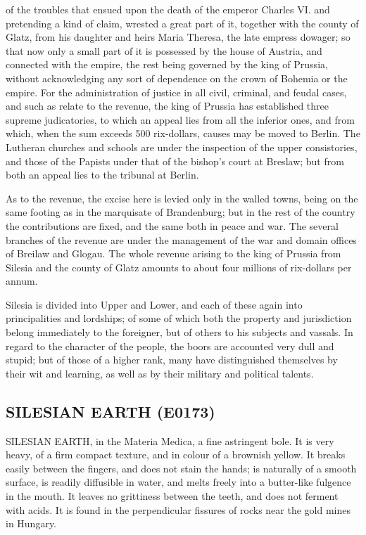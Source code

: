 \documentclass{article}
\begin{document}
of the troubles that ensued upon the death of the emperor Charles VI. and pretending a kind of claim, wrested a great part of it, together with the county of Glatz, from his daughter and heirs Maria Theresa, the late empress dowager; so that now only a small part of it is possessed by the house of Austria, and connected with the empire, the rest being governed by the king of Prussia, without acknowledging any sort of dependence on the crown of Bohemia or the empire. For the administration of justice in all civil, criminal, and feudal cases, and such as relate to the revenue, the king of Prussia has established three supreme judicatories, to which an appeal lies from all the inferior ones, and from which, when the sum exceeds 500 rix-dollars, causes may be moved to Berlin. The Lutheran churches and schools are under the inspection of the upper consistories, and those of the Papists under that of the bishop's court at Breslaw; but from both an appeal lies to the tribunal at Berlin.

As to the revenue, the excise here is levied only in the walled towns, being on the same footing as in the marquisate of Brandenburg; but in the rest of the country the contributions are fixed, and the same both in peace and war. The several branches of the revenue are under the management of the war and domain offices of Breilaw and Glogau. The whole revenue arising to the king of Prussia from Silesia and the county of Glatz amounts to about four millions of rix-dollars per annum.

Silesia is divided into Upper and Lower, and each of these again into principalities and lordships; of some of which both the property and jurisdiction belong immediately to the foreigner, but of others to his subjects and vassals. In regard to the character of the people, the boors are accounted very dull and stupid; but of those of a higher rank, many have distinguished themselves by their wit and learning, as well as by their military and political talents.

\subsection*{SILESIAN EARTH (E0173)}
SILESIAN EARTH, in the Materia Medica, a fine astringent bole. It is very heavy, of a firm compact texture, and in colour of a brownish yellow. It breaks easily between the fingers, and does not stain the hands; is naturally of a smooth surface, is readily diffusible in water, and melts freely into a butter-like fulgence in the mouth. It leaves no grittiness between the teeth, and does not ferment with acids. It is found in the perpendicular fissures of rocks near the gold mines in Hungary.
\end{document}
